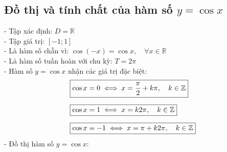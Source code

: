 \subsection{Đồ thị và tính chất của hàm số $y = \cos x$}
\noindent
\hspace*{1cm}
- Tập xác định: $D = \mathbb{R}$\\[6pt]
\hspace*{1cm}
- Tập giá trị: $[-1;1]$\\[6pt]
\hspace*{1cm}
- Là hàm số chẵn vì: $\cos(-x) = \cos x, \quad \forall x \in \mathbb{R}$\\[6pt]
\hspace*{1cm}
- Là hàm số tuần hoàn với chu kỳ: $T = 2 \pi$\\[6pt]
\hspace*{1cm}
- Hàm số $y = \cos x$ nhận các giá trị đặc biệt:\\[6pt]
\[
    \begin{aligned}
        &\fbox{$\cos x = 0 \iff x = \dfrac{\pi}{2} + k\pi, \quad k \in \mathbb{Z}$}\\[6pt]
        &\fbox{$\cos x = 1 \iff x = k2\pi, \quad k \in \mathbb{Z}$}\\[6pt]
        &\fbox{$\cos x = -1 \iff x = \pi + k2\pi, \quad k \in \mathbb{Z}$}
    \end{aligned}
\]
\hspace*{1cm}
- Đồ thị hàm số $y = \cos x$:\\
\begin{center}
    
\end{center}

